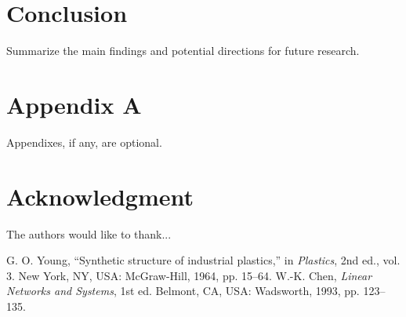 \documentclass[journal]{IEEEtran}
\begin{document}
\section{Conclusion}
Summarize the main findings and potential directions for future research.

\appendices
\section{Appendix A}
Appendixes, if any, are optional.

\section*{Acknowledgment}
The authors would like to thank...

\begin{thebibliography}{00}
 G. O. Young, ``Synthetic structure of industrial plastics,'' in \emph{Plastics}, 2nd ed., vol. 3. New York, NY, USA: McGraw-Hill, 1964, pp. 15--64.
 W.-K. Chen, \emph{Linear Networks and Systems}, 1st ed. Belmont, CA, USA: Wadsworth, 1993, pp. 123--135.
\end{thebibliography}
\end{document}
